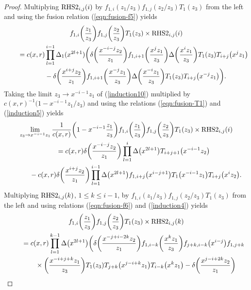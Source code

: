 \documentclass[10pt,a4paper]{amsart}
\numberwithin{equation}{section}
\begin{document}
\begin{proof}
Multiplying ${\rm RHS2}_{i,j}(i)$ by $f_{1,i}(z_1/z_3)f_{1,j}(z_2/z_3)T_1(z_3)$ from the left and using the fusion relation (\ref{eqn:fusion-f5}) yields
\begin{gather}
f_{1,i}\bigg(\frac{z_1}{z_3}\bigg)f_{1,j}\bigg(\frac{z_2}{z_3}\bigg)T_1(z_3)
\times {\rm RHS2}_{i, j}(i)\notag
\\ \qquad
{}=c(x,r)\prod_{l=1}^{i-1}\Delta_1(x^{2l+1})\bigg(\delta\bigg(\frac{x^{-i-j}z_2}{z_1}\bigg)
f_{1,i+1}\bigg(\frac{x^jz_1}{z_3}\bigg)\Delta\bigg(\frac{x^i z_1}{z_3}\bigg)T_1(z_3)T_{i+j}\big(x^jz_1\big)
\notag
\\ \qquad\hphantom{=}
{}-\delta\bigg(\frac{x^{i+j}z_2}{z_1}\bigg)f_{1,i+1}\bigg(\frac{x^{-j}z_1}{z_3}\bigg)
\Delta\bigg(\frac{x^{-i} z_1}{z_3}\bigg)T_1(z_3)T_{i+j}\big(x^{-j}z_1\big)\bigg).
\label{induction10}
\end{gather}
Taking the limit $z_3\to x^{-i-1}z_1$ of (\ref{induction10})
multiplied by $c(x,r)^{-1}\big(1-x^{-i-1}z_1/z_3\big)$
and using the relations (\ref{eqn:fusion-T1}) and (\ref{induction5}) yields
\begin{gather}
\lim_{z_3 \to x^{-i-1}z_1}\frac{1}{c(x,r)}\bigg(1-x^{-i-1}\frac{z_1}{z_3}\bigg)
f_{1,i}\bigg(\frac{z_1}{z_3}\bigg)f_{1,j}\bigg(\frac{z_2}{z_3}\bigg)T_1(z_3)
\times {\rm RHS2}_{i, j}(i)\notag
\\ \qquad
{}=c(x,r)\delta\bigg(\frac{x^{-i-j}z_2}{z_1}\bigg)\prod_{l=1}^i \Delta\big(x^{2l+1}\big)T_{i+j+1}\big(x^{-i-1}z_2\big)\notag
\\ \qquad \hphantom{=}
{}-c(x,r)\delta\bigg(\frac{x^{i+j}z_2}{z_1}\bigg)
\prod_{l=1}^{i-1} \Delta\big(x^{2l+1}\big)f_{1,i+j}\big(x^{i-j+1}\big)T_1\big(x^{-i-1}z_1\big)T_{i+j}\big(x^{i}z_2\big).
\label{induction11}
\end{gather}
Multiplying ${\rm RHS2}_{i,j}(k)$, $1\leq k \leq i-1$, by
$f_{1,i}(z_1/z_3)f_{1,j}(z_2/z_3)T_1(z_3)$
from the left and using relations (\ref{eqn:fusion-f6})
and (\ref{induction4}) yields
\begin{gather}
f_{1,i}\bigg(\frac{z_1}{z_3}\bigg)
f_{1,j}\bigg(\frac{z_2}{z_3}\bigg)T_1(z_3)
\times {\rm RHS2}_{i, j}(k)\label{induction12}
\\ \qquad
{}=c(x,r)\prod_{l=1}^{k-1}\Delta\big(x^{2l+1}\big)
\bigg(\delta\bigg(\frac{x^{-j+i-2k}z_2}{z_1}\bigg)
f_{1,i-k}\bigg(\frac{x^kz_1}{z_3}\bigg)f_{j+k,i-k}\big(x^{i-j}\big)f_{1,j+k} \notag
\\ \qquad \hphantom{=}
{}\times \bigg(\frac{x^{-i+j+k}z_1}{z_3}\bigg)
T_1(z_3)T_{j+k}\big(x^{j-i+k}z_1\big)T_{i-k}\big(x^kz_1\big)
-\delta\bigg(\frac{x^{j-i+2k}z_2}{z_1}\bigg)

\end{gather}
\end{proof}
\end{document}
